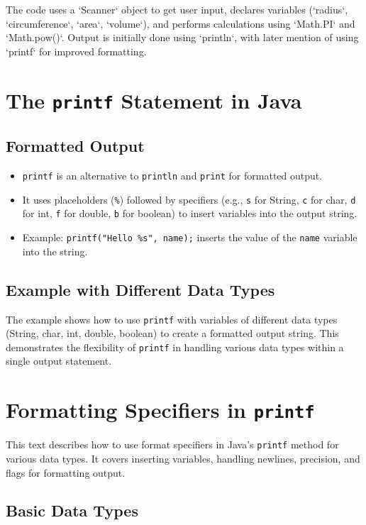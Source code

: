 \documentclass{article}
\begin{document}
The code uses a `Scanner` object to get user input, declares variables (`radius`, `circumference`, `area`, `volume`), and performs calculations using `Math.PI` and `Math.pow()`.  Output is initially done using `println`, with later mention of using `printf` for improved formatting.


\section{The \texttt{printf} Statement in Java}

\subsection{Formatted Output}

\begin{itemize}
    \item \texttt{printf} is an alternative to \texttt{println} and \texttt{print} for formatted output.
    \item It uses placeholders (\texttt{\%}) followed by specifiers (e.g., \texttt{s} for String, \texttt{c} for char, \texttt{d} for int, \texttt{f} for double, \texttt{b} for boolean) to insert variables into the output string.
    \item Example: \texttt{printf("Hello \%s", name);} inserts the value of the \texttt{name} variable into the string.
\end{itemize}

\subsection{Example with Different Data Types}

The example shows how to use \texttt{printf} with variables of different data types (String, char, int, double, boolean) to create a formatted output string.  This demonstrates the flexibility of \texttt{printf} in handling various data types within a single output statement.


\section{Formatting Specifiers in \texttt{printf}}

This text describes how to use format specifiers in Java's \texttt{printf} method for various data types.  It covers inserting variables, handling newlines, precision, and flags for formatting output.

\subsection{Basic Data Types}
\end{document}

